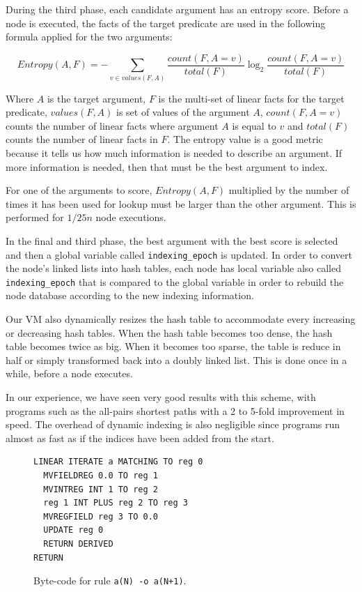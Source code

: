 During the third phase, each candidate argument has an entropy score.
Before a node is executed, the facts of the target predicate
are used in the following formula applied for the two arguments:

\vspace{-0.5\intextsep}

\[
Entropy(A, F) = - \sum_{v \in values(F, A)} \frac{count(F, A = v)}{total(F)} 	\log_2 \frac{count(F, A = v)}{total(F)}
\]
\vspace{-0.5\intextsep}

Where $A$ is the target argument, $F$ is the multi-set of linear facts for the target predicate, $values(F, A)$ is set of values of the argument $A$, $count(F, A = v)$ counts the number
of linear facts where argument $A$ is equal to $v$ and $total(F)$ counts the number of linear facts in $F$.
The entropy value is a good metric because it tells us how much information is needed to describe an argument.
If more information is needed, then that must be the best argument to index.

For one of the arguments to score, $Entropy(A, F)$ multiplied by the number of times it has been used for lookup must be larger than the other argument. This is performed for $1/25n$ node executions.

In the final and third phase, the best argument with the best score is selected and then
a global variable called \texttt{indexing\_epoch} is updated.
In order to convert the node's linked lists into hash tables, each node has local variable also called \texttt{indexing\_epoch}
that is compared to the global variable in order to rebuild the node database according to the new indexing
information.

Our VM also dynamically resizes the hash table to accommodate every increasing or decreasing hash tables. When the hash table becomes
too dense, the hash table becomes twice as big. When it becomes too sparse, the table is reduce in half
or simply transformed back into a doubly linked list. This is done once in a while, before a node executes.

In our experience, we have seen very good results with this scheme, with programs such as the all-pairs shortest paths with a 2 to 5-fold
improvement in speed. The overhead of dynamic indexing is also negligible since programs run almost as fast
as if the indices have been added from the start.

\begin{figure}
\vspace{-1.5\intextsep}
\scriptsize\begin{Verbatim}
LINEAR ITERATE a MATCHING TO reg 0
  MVFIELDREG 0.0 TO reg 1
  MVINTREG INT 1 TO reg 2
  reg 1 INT PLUS reg 2 TO reg 3
  MVREGFIELD reg 3 TO 0.0
  UPDATE reg 0
  RETURN DERIVED
RETURN
\end{Verbatim}
\vspace{-0.5\intextsep}
\caption{\small{Byte-code for rule \texttt{a(N) -o a(N+1)}.}}
\label{code:update}
\vspace{-1.3\intextsep}
\end{figure}

